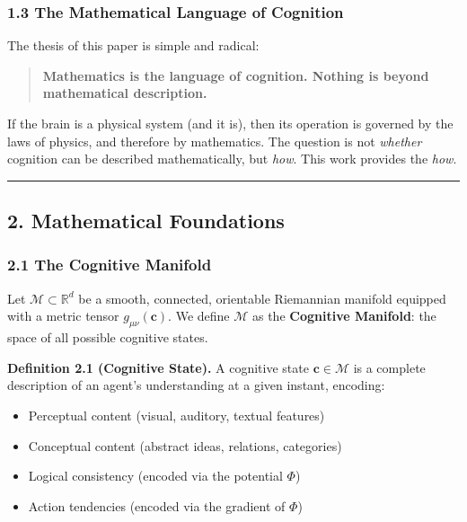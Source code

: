 \documentclass[
  11pt,
  a4paper,
]{article}
\providecommand{\tightlist}{%
  \setlength{\itemsep}{0pt}\setlength{\parskip}{0pt}}
\begin{document}
\subsubsection{1.3 The Mathematical Language of
Cognition}\label{the-mathematical-language-of-cognition}

The thesis of this paper is simple and radical:

\begin{quote}
\textbf{Mathematics is the language of cognition. Nothing is beyond
mathematical description.}
\end{quote}

If the brain is a physical system (and it is), then its operation is
governed by the laws of physics, and therefore by mathematics. The
question is not \emph{whether} cognition can be described
mathematically, but \emph{how}. This work provides the \emph{how}.

\begin{center}\rule{0.5\linewidth}{0.5pt}\end{center}

\subsection{2. Mathematical Foundations}\label{mathematical-foundations}

\subsubsection{2.1 The Cognitive Manifold}\label{the-cognitive-manifold}

Let \(\mathcal{M} \subset \mathbb{R}^d\) be a smooth, connected,
orientable Riemannian manifold equipped with a metric tensor
\(g_{\mu\nu}(\mathbf{c})\). We define \(\mathcal{M}\) as the
\textbf{Cognitive Manifold}: the space of all possible cognitive states.

\textbf{Definition 2.1 (Cognitive State).} A cognitive state
\(\mathbf{c} \in \mathcal{M}\) is a complete description of an agent's
understanding at a given instant, encoding:

\begin{itemize}
\tightlist
\item
  Perceptual content (visual, auditory, textual features)
\item
  Conceptual content (abstract ideas, relations, categories)
\item
  Logical consistency (encoded via the potential \(\Phi\))
\item
  Action tendencies (encoded via the gradient of \(\Phi\))
\end{itemize}
\end{document}

